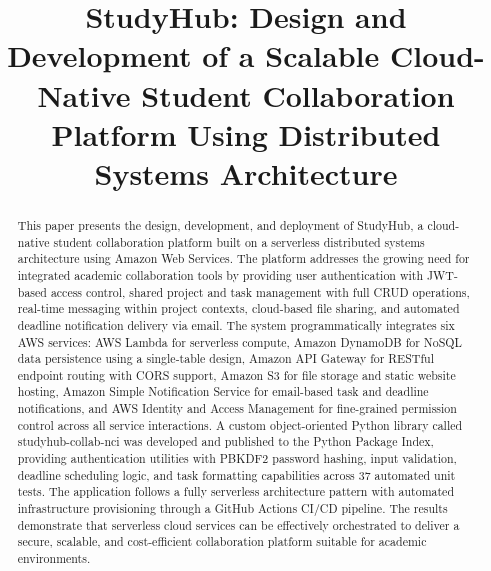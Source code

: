 \documentclass[conference]{IEEEtran}
\begin{document}
\title{StudyHub: Design and Development of a Scalable Cloud-Native Student Collaboration Platform Using Distributed Systems Architecture}

\author{
}

\maketitle

\begin{abstract}
This paper presents the design, development, and deployment of StudyHub, a cloud-native student collaboration platform built on a serverless distributed systems architecture using Amazon Web Services. The platform addresses the growing need for integrated academic collaboration tools by providing user authentication with JWT-based access control, shared project and task management with full CRUD operations, real-time messaging within project contexts, cloud-based file sharing, and automated deadline notification delivery via email. The system programmatically integrates six AWS services: AWS Lambda for serverless compute, Amazon DynamoDB for NoSQL data persistence using a single-table design, Amazon API Gateway for RESTful endpoint routing with CORS support, Amazon S3 for file storage and static website hosting, Amazon Simple Notification Service for email-based task and deadline notifications, and AWS Identity and Access Management for fine-grained permission control across all service interactions. A custom object-oriented Python library called studyhub-collab-nci was developed and published to the Python Package Index, providing authentication utilities with PBKDF2 password hashing, input validation, deadline scheduling logic, and task formatting capabilities across 37 automated unit tests. The application follows a fully serverless architecture pattern with automated infrastructure provisioning through a GitHub Actions CI/CD pipeline. The results demonstrate that serverless cloud services can be effectively orchestrated to deliver a secure, scalable, and cost-efficient collaboration platform suitable for academic environments.
\end{abstract}
\end{document}
